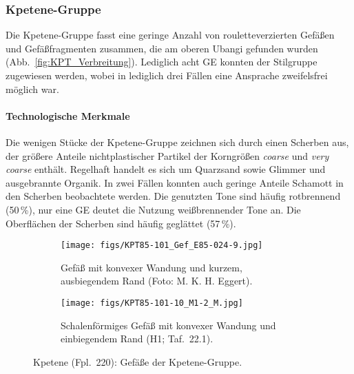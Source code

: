 \subsubsection{Kpetene-Gruppe}\label{sec:KPT-Gr}


Die Kpetene-Gruppe fasst eine geringe Anzahl von rouletteverzierten Gefäßen und Gefäßfragmenten zusammen, die am oberen Ubangi gefunden wurden (Abb.~\ref{fig:KPT_Verbreitung}). Lediglich acht GE konnten der Stilgruppe zugewiesen werden, wobei in lediglich drei Fällen eine Ansprache zweifelsfrei möglich war.


\paragraph{Technologische Merkmale}
$\;$ \\
Die wenigen Stücke der Kpetene-Gruppe zeichnen sich durch einen Scherben aus, der größere Anteile nichtplastischer Partikel der Korngrößen \textit{coarse} und \textit{very coarse} enthält. Regelhaft handelt es sich um Quarzsand sowie Glimmer und ausgebrannte Organik. In zwei Fällen konnten auch geringe Anteile Schamott in den Scherben beobachtete werden. Die genutzten Tone sind häufig rotbrennend (50\,\%), nur eine GE deutet die Nutzung weißbrennender Tone an. Die Oberflächen der Scherben sind häufig geglättet (57\,\%).

\begin{figure*}[tb]
	\centering
	\begin{subfigure}[b]{.49\textwidth}
		\centering
		\texttt{[image: figs/KPT85-101\_Gef\_E85-024-9.jpg]}
		\caption{Gefäß mit konvexer Wandung und kurzem, ausbiegendem Rand (Foto: M. K. H. Eggert).}
		\label{fig:KPT85_Foto-Gef}
	\end{subfigure}
	\begin{subfigure}[b]{.49\textwidth}
		\centering
		\texttt{[image: figs/KPT85-101-10\_M1-2\_M.jpg]}
		\caption{Schalenförmiges Gefäß mit konvexer Wandung und einbiegendem Rand (H1; Taf.~22.1).}
		\label{fig:KPT85-101-Gef}
	\end{subfigure}
	\caption{Kpetene (Fpl.~220): Gefäße der Kpetene-Gruppe.}
	\label{fig:KPT85_Typvertreter}
\end{figure*}

